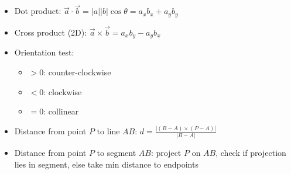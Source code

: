 \begin{itemize}
  \item Dot product: $\vec{a} \cdot \vec{b} = |a||b|\cos\theta = a_x b_x + a_y b_y$
  \item Cross product (2D): $\vec{a} \times \vec{b} = a_x b_y - a_y b_x$
  \item Orientation test: 
    \begin{itemize}
      \item $>0$: counter-clockwise
      \item $<0$: clockwise
      \item $=0$: collinear
    \end{itemize}
  \item Distance from point $P$ to line $AB$: $d = \frac{|(B-A)\times(P-A)|}{|B-A|}$
  \item Distance from point $P$ to segment $AB$: project $P$ on $AB$, check if projection lies in segment, else take min distance to endpoints
\end{itemize}
